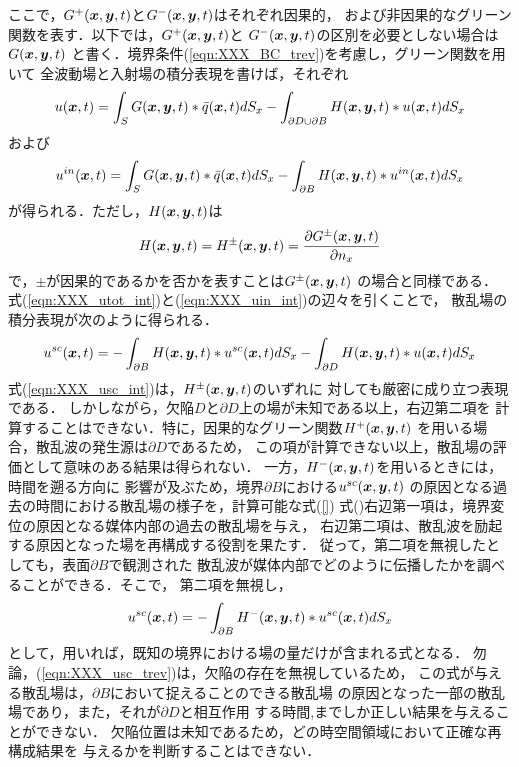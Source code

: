 ここで，$G^+(\mbox{\boldmath $x$},\mbox{\boldmath $y$},t)$と$G^-(\mbox{\boldmath $x$},\mbox{\boldmath $y$},t)$はそれぞれ因果的，
および非因果的なグリーン関数を表す．以下では，$G^+(\mbox{\boldmath $x$},\mbox{\boldmath $y$},t)$と
$G^-(\mbox{\boldmath $x$},\mbox{\boldmath $y$},t)$の区別を必要としない場合は$G(\mbox{\boldmath $x$},\mbox{\boldmath $y$},t)$
と書く．境界条件(\ref{eqn:XXX_BC_trev})を考慮し，グリーン関数を用いて
全波動場と入射場の積分表現を書けば，それぞれ
\begin{equation}
	u(\mbox{\boldmath $x$},t) 
	=
	\int_S G(\mbox{\boldmath $x$},\mbox{\boldmath $y$},t) * \bar{q}(\mbox{\boldmath $x$},t)dS_x 
	-
	\int_{\partial D \cup \partial B} H(\mbox{\boldmath $x$},\mbox{\boldmath $y$},t) * u(\mbox{\boldmath $x$},t)dS_x 
	\label{eqn:XXX_utot_int}
\end{equation}
および
\begin{equation}
	u^{in}(\mbox{\boldmath $x$},t) 
	=
	\int_S G(\mbox{\boldmath $x$},\mbox{\boldmath $y$},t) * \bar{q}(\mbox{\boldmath $x$},t)dS_x 
	-
	\int_{\partial B} H(\mbox{\boldmath $x$},\mbox{\boldmath $y$},t) * u^{in}(\mbox{\boldmath $x$},t)dS_x 
	\label{eqn:XXX_uin_int}
\end{equation}
が得られる．ただし，$H(\mbox{\boldmath $x$},\mbox{\boldmath $y$},t)$は
\begin{equation}
	H(\mbox{\boldmath $x$},\mbox{\boldmath $y$},t)
	=
	H^{\pm}(\mbox{\boldmath $x$},\mbox{\boldmath $y$},t)
	=
	\frac{\partial G^\pm(\mbox{\boldmath $x$},\mbox{\boldmath $y$},t)}{\partial n_x}
	\label{eqn:XXX_def_H}
\end{equation}
で，$\pm$が因果的であるかを否かを表すことは$G^{\pm}(\mbox{\boldmath $x$},\mbox{\boldmath $y$},t)$
の場合と同様である．
式(\ref{eqn:XXX_utot_int})と(\ref{eqn:XXX_uin_int})の辺々を引くことで，
散乱場の積分表現が次のように得られる．
\begin{equation}
	u^{sc}(\mbox{\boldmath $x$},t) 
	=
	-
	\int_{\partial B} H(\mbox{\boldmath $x$},\mbox{\boldmath $y$},t) * u^{sc}(\mbox{\boldmath $x$},t)dS_x 
	-
	\int_{\partial D} H(\mbox{\boldmath $x$},\mbox{\boldmath $y$},t) * u(\mbox{\boldmath $x$},t)dS_x 
	\label{eqn:XXX_usc_int}
\end{equation}
式(\ref{eqn:XXX_usc_int})は，$H^{\pm}(\mbox{\boldmath $x$},\mbox{\boldmath $y$},t)$のいずれに
対しても厳密に成り立つ表現である．
しかしながら，欠陥$D$と$\partial D$上の場が未知である以上，右辺第二項を
計算することはできない．特に，因果的なグリーン関数$H^+(\mbox{\boldmath $x$},\mbox{\boldmath $y$},t)$
を用いる場合，散乱波の発生源は$\partial D$であるため，
この項が計算できない以上，散乱場の評価として意味のある結果は得られない．
一方，$H^-(\mbox{\boldmath $x$},\mbox{\boldmath $y$},t)$を用いるときには，時間を遡る方向に
影響が及ぶため，境界$\partial B$における$u^{sc}(\mbox{\boldmath $x$},\mbox{\boldmath $y$},t)$
の原因となる過去の時間における散乱場の様子を，計算可能な式(\ref{})
式()右辺第一項は，境界変位の原因となる媒体内部の過去の散乱場を与え，
右辺第二項は、散乱波を励起する原因となった場を再構成する役割を果たす．
従って，第二項を無視したとしても，表面$\partial B$で観測された
散乱波が媒体内部でどのように伝播したかを調べることができる．そこで，
第二項を無視し，
\begin{equation}
	u^{sc}(\mbox{\boldmath $x$},t) 
	=
	-
	\int_{\partial B} H^-(\mbox{\boldmath $x$},\mbox{\boldmath $y$},t) * u^{sc}(\mbox{\boldmath $x$},t)dS_x 
	\label{eqn:XXX_usc_trev}
\end{equation}
として，用いれば，既知の境界における場の量だけが含まれる式となる．
勿論，(\ref{eqn:XXX_usc_trev})は，欠陥の存在を無視しているため，
この式が与える散乱場は，$\partial B$において捉えることのできる散乱場
の原因となった一部の散乱場であり，また，それが$\partial D$と相互作用
する時間,までしか正しい結果を与えることができない．
欠陥位置は未知であるため，どの時空間領域において正確な再構成結果を
与えるかを判断することはできない．

